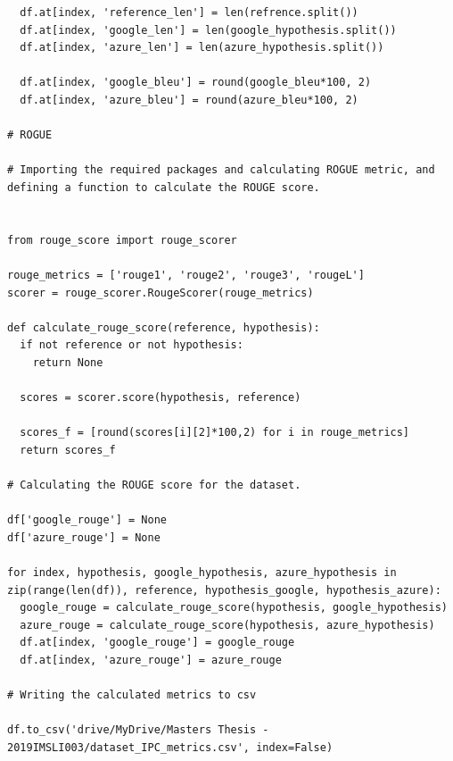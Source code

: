 \begin{verbatim}
  df.at[index, 'reference_len'] = len(refrence.split())
  df.at[index, 'google_len'] = len(google_hypothesis.split())
  df.at[index, 'azure_len'] = len(azure_hypothesis.split())

  df.at[index, 'google_bleu'] = round(google_bleu*100, 2)
  df.at[index, 'azure_bleu'] = round(azure_bleu*100, 2)

# ROGUE

# Importing the required packages and calculating ROGUE metric, and defining a function to calculate the ROUGE score.


from rouge_score import rouge_scorer

rouge_metrics = ['rouge1', 'rouge2', 'rouge3', 'rougeL']
scorer = rouge_scorer.RougeScorer(rouge_metrics)

def calculate_rouge_score(reference, hypothesis):
  if not reference or not hypothesis:
    return None

  scores = scorer.score(hypothesis, reference)

  scores_f = [round(scores[i][2]*100,2) for i in rouge_metrics]
  return scores_f

# Calculating the ROUGE score for the dataset.

df['google_rouge'] = None
df['azure_rouge'] = None

for index, hypothesis, google_hypothesis, azure_hypothesis in zip(range(len(df)), reference, hypothesis_google, hypothesis_azure):
  google_rouge = calculate_rouge_score(hypothesis, google_hypothesis)
  azure_rouge = calculate_rouge_score(hypothesis, azure_hypothesis)
  df.at[index, 'google_rouge'] = google_rouge
  df.at[index, 'azure_rouge'] = azure_rouge

# Writing the calculated metrics to csv

df.to_csv('drive/MyDrive/Masters Thesis - 2019IMSLI003/dataset_IPC_metrics.csv', index=False)
\end{verbatim}
\doublespacing